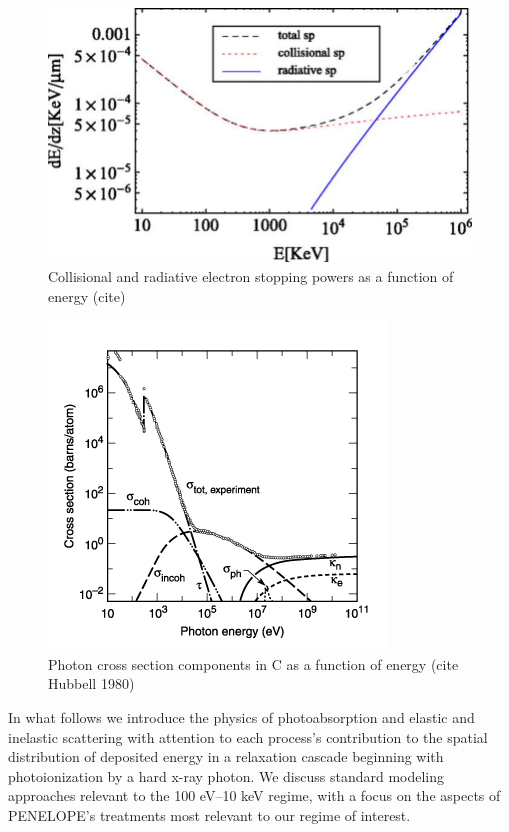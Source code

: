 \documentclass [11pt, proquest, article] {uwthesis}[2016/11/22]
\begin{document}
\begin{figure}[h] 
\caption{Collisional and radiative electron stopping powers as a function of energy (cite)}
\label{fig:sp}
\centering
\includegraphics[scale=0.4]{../Figures/collisional_sp.png}
\end{figure}

\begin{figure}[h] 
\caption{Photon cross section components in C as a function of energy (cite Hubbell 1980)}
\label{fig:photon_sigma}
\centering
\includegraphics[scale=1]{../Figures/photon_sigma.png}
\end{figure}

In what follows we introduce the physics of photoabsorption and elastic and inelastic scattering with attention to each process's contribution to the spatial distribution of deposited energy in a relaxation cascade beginning with photoionization by a hard x-ray photon. We discuss standard modeling approaches relevant to the 100 eV--10 keV regime, with a focus on the aspects of PENELOPE's treatments most relevant to our regime of interest. %
\end{document}
